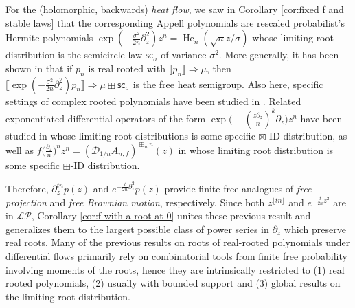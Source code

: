 \documentclass[reqno]{amsart}
\newcommand{\1}{\mathbf{1}}
\DeclareMathOperator{\He}{He}
\newcommand{\LP}{\mathcal{LP}}
\theoremstyle{plain}
\theoremstyle{definition}
\theoremstyle{remark}
\numberwithin{equation}{section}
\begin{document}
For the (holomorphic, backwards) \emph{heat flow}, we saw in Corollary \ref{cor:fixed f and stable laws} that the corresponding Appell polynomials are rescaled probabilist's Hermite polynomials $%
\exp(-\frac{\sigma^2}{2n}\partial_z^2 )z^{n} = \He_n(\sqrt n z/\sigma)$ whose limiting root distribution is the semicircle law $\mathsf{sc_{\sigma}}$ of variance $\sigma^2$. More generally, it has been shown in \cite{Kabluchko2022leeyang,VW22,Jalowy-Kabluchko-Marynych2025part2} that if $p_n$ is real rooted with $\llbracket p_n\rrbracket\Rightarrow \mu$, then $\llbracket\exp(-\frac{\sigma^2}{2n}\partial_z^2 )p_n\rrbracket\Rightarrow \mu\boxplus\mathsf{sc}_\sigma$ is the free heat semigroup. Also here, specific settings of complex rooted polynomials have been studied in \cite{Hall-Ho-Jalowy-Kabluchko2023,Hall-Ho-Jalowy-Kabluchko2023heat,Hall-Ho2022heat,Hofert}. Related exponentiated differential operators of the form $\exp\big(-(\frac{z\partial_z}{n})^k\partial_z\big)z^n$ have been studied in \cite{Jalowy-Kabluchko-Marynych2025part2} whose limiting root distributions is some specific $\boxtimes$-ID distribution, as well as $f\big(\frac{\partial_z}{n}\big)^nz^n=(\mathcal D_{1/n} A_{n,f})^{\boxplus_n n}(z)$ in \cite{campbell2025freeinfinitedivisibilityfractional} whose limiting root distribution is some specific $\boxplus$-ID distribution.


 Therefore, $\partial_{z}^{tn}p(z)$ and $e^{-\frac{t}{2n} \partial_{z}^2 }p(z)$ provide finite free analogues of \emph{free projection} and \emph{free Brownian motion}, respectively. Since both $z^{\lfloor tn\rfloor}$ and $e^{-\frac{t}{2n}{z}^2 }$ are in $\LP$, Corollary \ref{cor:f with a root at 0} unites these previous result and generalizes them to the largest possible class of power series in $\partial_{z}$ which preserve real roots. 
Many of the previous results on roots of real-rooted polynomials under differential flows primarily rely on combinatorial tools from finite free probability involving moments of the roots, hence they are intrinsically restricted to (1) real rooted polynomials, (2) usually with bounded support and (3) global results on the limiting root distribution.
\end{document}

